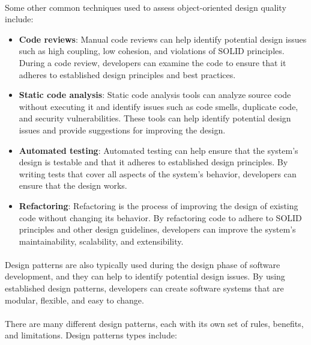 \paragraph{}
Some other common techniques used to assess object-oriented design quality include:
\begin{itemize}
    \item \textbf{Code reviews}: Manual code reviews can help identify potential design issues such as high coupling, low cohesion, and violations of SOLID principles. During a code review, developers can examine the code to ensure that it adheres to established design principles and best practices.
    \item \textbf{Static code analysis}: Static code analysis tools can analyze source code without executing it and identify issues such as code smells, duplicate code, and security vulnerabilities. These tools can help identify potential design issues and provide suggestions for improving the design.
    \item \textbf{Automated testing}: Automated testing can help ensure that the system's design is testable and that it adheres to established design principles. By writing tests that cover all aspects of the system's behavior, developers can ensure that the design works.
    \item \textbf{Refactoring}: Refactoring is the process of improving the design of existing code without changing its behavior. By refactoring code to adhere to SOLID principles and other design guidelines, developers can improve the system's maintainability, scalability, and extensibility.
\end{itemize}

\paragraph{}
Design patterns are also typically used during the design phase of software development, and they can help to identify potential design issues. By using established design patterns, developers can create software systems that are modular, flexible, and easy to change.

\paragraph{}
There are many different design patterns, each with its own set of rules, benefits, and limitations. Design patterns types include:


